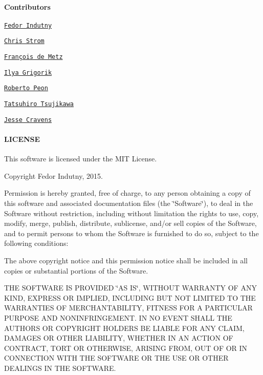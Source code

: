 \paragraph*{Contributors}


\begin{DoxyItemize}
\item \href{https://github.com/indutny}{\tt Fedor Indutny}
\item \href{https://github.com/eee-c}{\tt Chris Strom}
\item \href{https://github.com/francois2metz}{\tt François de Metz}
\item \href{https://github.com/igrigorik}{\tt Ilya Grigorik}
\item \href{https://github.com/grmocg}{\tt Roberto Peon}
\item \href{https://github.com/tatsuhiro-t}{\tt Tatsuhiro Tsujikawa}
\item \href{https://github.com/jessecravens}{\tt Jesse Cravens}
\end{DoxyItemize}

\paragraph*{L\+I\+C\+E\+N\+SE}

This software is licensed under the M\+IT License.

Copyright Fedor Indutny, 2015.

Permission is hereby granted, free of charge, to any person obtaining a copy of this software and associated documentation files (the \char`\"{}\+Software\char`\"{}), to deal in the Software without restriction, including without limitation the rights to use, copy, modify, merge, publish, distribute, sublicense, and/or sell copies of the Software, and to permit persons to whom the Software is furnished to do so, subject to the following conditions\+:

The above copyright notice and this permission notice shall be included in all copies or substantial portions of the Software.

T\+HE S\+O\+F\+T\+W\+A\+RE IS P\+R\+O\+V\+I\+D\+ED \char`\"{}\+A\+S I\+S\char`\"{}, W\+I\+T\+H\+O\+UT W\+A\+R\+R\+A\+N\+TY OF A\+NY K\+I\+ND, E\+X\+P\+R\+E\+SS OR I\+M\+P\+L\+I\+ED, I\+N\+C\+L\+U\+D\+I\+NG B\+UT N\+OT L\+I\+M\+I\+T\+ED TO T\+HE W\+A\+R\+R\+A\+N\+T\+I\+ES OF M\+E\+R\+C\+H\+A\+N\+T\+A\+B\+I\+L\+I\+TY, F\+I\+T\+N\+E\+SS F\+OR A P\+A\+R\+T\+I\+C\+U\+L\+AR P\+U\+R\+P\+O\+SE A\+ND N\+O\+N\+I\+N\+F\+R\+I\+N\+G\+E\+M\+E\+NT. IN NO E\+V\+E\+NT S\+H\+A\+LL T\+HE A\+U\+T\+H\+O\+RS OR C\+O\+P\+Y\+R\+I\+G\+HT H\+O\+L\+D\+E\+RS BE L\+I\+A\+B\+LE F\+OR A\+NY C\+L\+A\+IM, D\+A\+M\+A\+G\+ES OR O\+T\+H\+ER L\+I\+A\+B\+I\+L\+I\+TY, W\+H\+E\+T\+H\+ER IN AN A\+C\+T\+I\+ON OF C\+O\+N\+T\+R\+A\+CT, T\+O\+RT OR O\+T\+H\+E\+R\+W\+I\+SE, A\+R\+I\+S\+I\+NG F\+R\+OM, O\+UT OF OR IN C\+O\+N\+N\+E\+C\+T\+I\+ON W\+I\+TH T\+HE S\+O\+F\+T\+W\+A\+RE OR T\+HE U\+SE OR O\+T\+H\+ER D\+E\+A\+L\+I\+N\+GS IN T\+HE S\+O\+F\+T\+W\+A\+RE. 